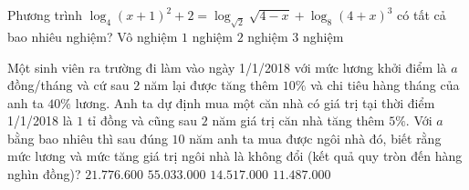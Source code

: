 \begin{ex}%
	Phương trình $\log_4(x+1)^2+2=\log_{\sqrt{2}}\sqrt{4-x}+\log_8(4+x)^3$ có tất cả bao nhiêu nghiệm?
	\choice
	{Vô nghiệm}
	{$1$ nghiệm}
	{\True $2$ nghiệm}
	{$3$ nghiệm}
\end{ex}

\begin{ex}%
	Một sinh viên ra trường đi làm vào ngày 1/1/2018 với mức lương khởi điểm là $a$ đồng/tháng và cứ sau $2$ năm lại được tăng thêm $10\%$ và chi tiêu hàng tháng của anh ta $40\%$ lương. Anh ta dự định mua một căn nhà có giá trị tại thời điểm 1/1/2018 là $1$ tỉ đồng và cũng sau $2$ năm giá trị căn nhà tăng thêm $5\%$. Với $a$ bằng bao nhiêu thì sau đúng $10$ năm anh ta mua được ngôi nhà đó, biết rằng mức lương và mức tăng giá trị ngôi nhà là không đổi (kết quả quy tròn đến hàng nghìn đồng)?
	\choice
	{$21.776.600$}
	{$55.033.000$}
	{\True $14.517.000$}
	{$11.487.000$}
\end{ex}

